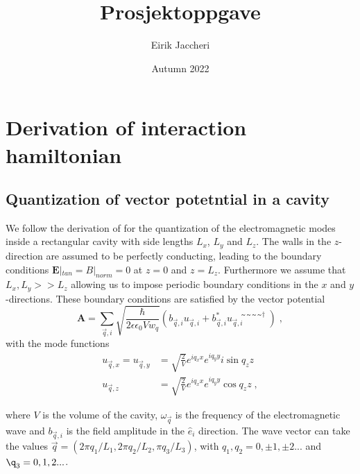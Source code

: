\documentclass{article}
\title{Prosjektoppgave}
\author{Eirik Jaccheri}
\date{Autumn 2022}
\begin{document}
\maketitle

\section{Derivation of interaction hamiltonian}

\subsection{Quantization of vector potetntial in a cavity}
We follow the derivation of \cite{QuantizationEMCavities} for the quantization of the electromagnetic modes inside a rectangular cavity with side lengths $L_x$, $L_y$ and $L_z$. The walls in the $z$-direction are assumed to be perfectly conducting, leading to the boundary conditions $\textbf{E}|_{tan} = B|_{norm} = 0$ at $z=0$ and $z = L_z$. Furthermore we assume that $L_x, L_y >> L_z$ allowing us to impose periodic boundary conditions in the $x$ and $y$-directions. These boundary conditions are satisfied by the vector potential
\begin{equation}
    \textbf{A} = \sum_{\vec{q},i} \sqrt{\frac{\hbar}{2 \epsilon \epsilon_0 V w_q}} \left(b_{\vec{q}, i} u_{\vec{q},i} + b_{\vec{q}, i}^{*} u_{\vec{q},i}̃̃̃̃^{\dagger}\right)\;,
    \label{classical vector potential}
\end{equation}
with the mode functions
\begin{align*}
    u_{\vec{q}, x} = u_{\vec{q}, y} &= \sqrt{\frac{2}{V}} e^{iq_x x} e^{iq_y y} i \sin{q_z z}\\
                     u_{\vec{q}, z} &= \sqrt{\frac{2}{V}} e^{iq_x x} e^{iq_y y} \cos{q_z z} \;,
\end{align*}

where $V$ is the volume of the cavity, $\omega_{\vec{q}}$ is the frequency of the electromagnetic wave and $b_{\vec{q}, i}$ is the field amplitude in the $\hat{e}_i$ direction. The wave vector can take the values $\vec{q} = (2\pi q_1 / L_1, 2\pi q_2 / L_2, \pi q_3 / L_3 )$, with $q_1, q_2 = 0, \pm 1, \pm 2...$ and $\q_3 = 0, 1, 2...$. 
\end{document}
